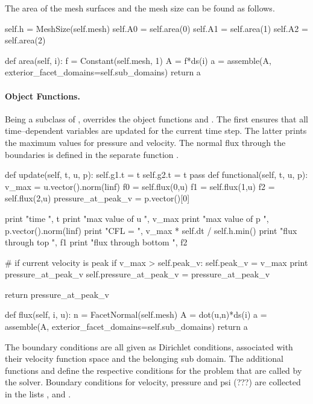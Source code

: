 The area of the mesh surfaces and the mesh size can be found as follows. 
\begin{code}
self.h = MeshSize(self.mesh)
self.A0 = self.area(0)
self.A1 = self.area(1)
self.A2 = self.area(2)

def area(self, i): 
	f = Constant(self.mesh, 1)
	A = f*ds(i)
	a = assemble(A, exterior_facet_domains=self.sub_domains)
	return a 
\end{code}



\paragraph{Object Functions.} Being a subclass of ,  overrides the object functions  and . The first ensures that all time--dependent variables are updated for the current time step. The latter prints the maximum values for pressure and velocity. The normal flux through the boundaries is defined in the separate function .
\begin{code}
def update(self, t, u, p):
	self.g1.t = t
	self.g2.t = t
	pass
def functional(self, t, u, p):
	v_max = u.vector().norm(linf)
	f0 = self.flux(0,u)
	f1 = self.flux(1,u)
	f2 = self.flux(2,u)
	pressure_at_peak_v = p.vector()[0]

	print "time ", t 
	print "max value of u ", v_max
	print "max value of p ", p.vector().norm(linf)
	print "CFL = ", v_max * self.dt / self.h.min()
	print "flux through top ", f1
	print "flux through bottom ", f2

	# if current velocity is peak
	if v_max >  self.peak_v:
		self.peak_v = v_max
		print pressure_at_peak_v
		self.pressure_at_peak_v = pressure_at_peak_v

	return pressure_at_peak_v

def flux(self, i, u): 
	n = FacetNormal(self.mesh)
	A = dot(u,n)*ds(i)
	a = assemble(A, exterior_facet_domains=self.sub_domains)
	return a 
\end{code}

The boundary conditions are all given as Dirichlet conditions, associated with their velocity function space and the belonging sub domain. The additional functions  and  define the respective conditions for the problem that are called by the solver. Boundary conditions for velocity, pressure and psi (???) are collected in the lists ,  and . 

